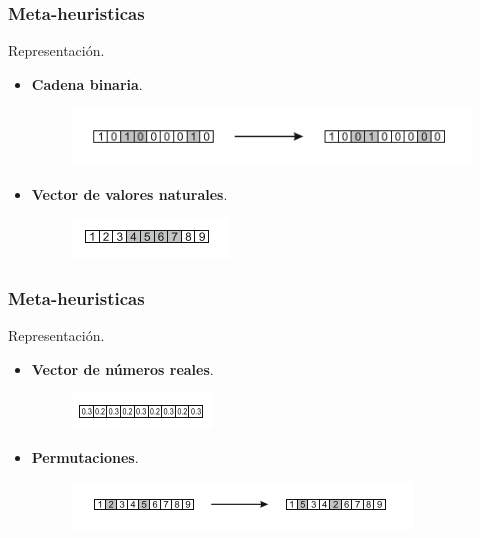 \begin{frame}[allowframebreaks]
\frametitle{Meta-heuristicas}
\begin{block}{Representación.}
\begin{itemize}
    \item \textbf{Cadena binaria}.
    \begin{figure}[!ht]
    \centering
    \includegraphics[scale=1.2]{img/binaria}
    \end{figure} 
    \item \textbf{Vector de valores naturales}.
    \begin{figure}[!ht]
    \centering
    \includegraphics[scale=1.2]{img/natural}
    \end{figure}
\end{itemize}
\end{block}
\end{frame}
\begin{frame}[allowframebreaks]
\frametitle{Meta-heuristicas}
\begin{block}{Representación.}
\begin{itemize}
    \item \textbf{Vector de números reales}.
    \begin{figure}[!ht]
    \centering
    \includegraphics[scale=1.2]{img/reales}
    \end{figure}
    \item \textbf{Permutaciones}.
    \begin{figure}[!ht]
    \centering
    \includegraphics[scale=0.8]{img/secuencia}
    \end{figure}
\end{itemize}
\end{block}
\end{frame}

